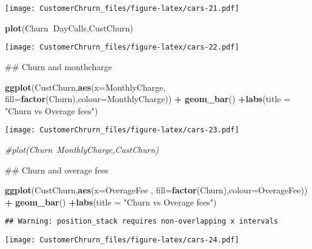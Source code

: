 \documentclass[]{article}
\newenvironment{Shaded}{\begin{snugshade}}{\end{snugshade}}
\newcommand{\KeywordTok}[1]{\textcolor[rgb]{0.13,0.29,0.53}{\textbf{#1}}}
\newcommand{\DataTypeTok}[1]{\textcolor[rgb]{0.13,0.29,0.53}{#1}}
\newcommand{\StringTok}[1]{\textcolor[rgb]{0.31,0.60,0.02}{#1}}
\newcommand{\CommentTok}[1]{\textcolor[rgb]{0.56,0.35,0.01}{\textit{#1}}}
\newcommand{\OperatorTok}[1]{\textcolor[rgb]{0.81,0.36,0.00}{\textbf{#1}}}
\newcommand{\NormalTok}[1]{#1}
\begin{document}
\texttt{[image: CustomerChrurn\_files/figure-latex/cars-21.pdf]}

\begin{Shaded}
\begin{Highlighting}[]
\KeywordTok{plot}\NormalTok{(Churn}\OperatorTok{~}\NormalTok{DayCalls,CustChurn)}
\end{Highlighting}
\end{Shaded}

\texttt{[image: CustomerChrurn\_files/figure-latex/cars-22.pdf]}

\begin{Shaded}
\begin{Highlighting}[]
\NormalTok{## Churn and monthcharge }

\KeywordTok{ggplot}\NormalTok{(CustChurn,}\KeywordTok{aes}\NormalTok{(}\DataTypeTok{x=}\NormalTok{MonthlyCharge, }\DataTypeTok{fill=}\KeywordTok{factor}\NormalTok{(Churn),}\DataTypeTok{colour=}\NormalTok{MonthlyCharge))  }\OperatorTok{+}\StringTok{ }\KeywordTok{geom_bar}\NormalTok{() }\OperatorTok{+}\KeywordTok{labs}\NormalTok{(}\DataTypeTok{title =} \StringTok{"Churn vs Overage fees"}\NormalTok{)}
\end{Highlighting}
\end{Shaded}

\texttt{[image: CustomerChrurn\_files/figure-latex/cars-23.pdf]}

\begin{Shaded}
\begin{Highlighting}[]
\CommentTok{#plot(Churn~MonthlyCharge,CustChurn)}


\NormalTok{## Churn and overage fees }

\KeywordTok{ggplot}\NormalTok{(CustChurn,}\KeywordTok{aes}\NormalTok{(}\DataTypeTok{x=}\NormalTok{OverageFee  , }\DataTypeTok{fill=}\KeywordTok{factor}\NormalTok{(Churn),}\DataTypeTok{colour=}\NormalTok{OverageFee))  }\OperatorTok{+}\StringTok{ }\KeywordTok{geom_bar}\NormalTok{() }\OperatorTok{+}\KeywordTok{labs}\NormalTok{(}\DataTypeTok{title =} \StringTok{"Churn vs Overage fees"}\NormalTok{)}
\end{Highlighting}
\end{Shaded}

\begin{verbatim}
## Warning: position_stack requires non-overlapping x intervals
\end{verbatim}

\texttt{[image: CustomerChrurn\_files/figure-latex/cars-24.pdf]}
\end{document}
